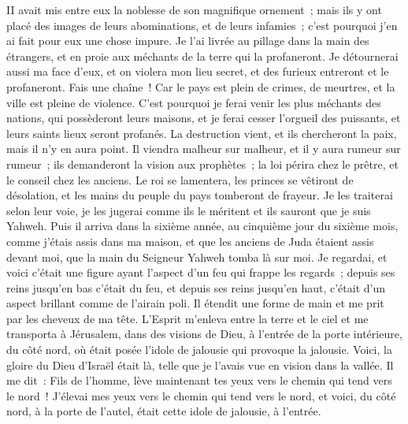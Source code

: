 \begin{multicols}{2}
II avait mis entre eux la noblesse de son magnifique ornement~; mais ils y ont placé des images de leurs abominations, et de leurs infamies~; c'est pourquoi j'en ai fait pour eux une chose impure.
Je l'ai livrée au pillage dans la main des étrangers, et en proie aux méchants de la terre qui la profaneront.
Je détournerai aussi ma face d'eux, et on violera mon lieu secret, et des furieux entreront et le profaneront.
Fais une chaîne~! Car le pays est plein de crimes, de meurtres, et la ville est pleine de violence.
C'est pourquoi je ferai venir les plus méchants des nations, qui possèderont leurs maisons, et je ferai cesser l'orgueil des puissants, et leurs saints lieux seront profanés.
La destruction vient, et ils chercheront la paix, mais il n'y en aura point.
Il viendra malheur sur malheur, et il y aura rumeur sur rumeur~; ils demanderont la vision aux prophètes~; la loi périra chez le prêtre, et le conseil chez les anciens.
Le roi se lamentera, les princes se vêtiront de désolation, et les mains du peuple du pays tomberont de frayeur. Je les traiterai selon leur voie, je les jugerai comme ils le méritent et ils sauront que je suis Yahweh.
\VerseOne{}Puis il arriva dans la sixième année, au cinquième jour du sixième mois, comme j'étais assis dans ma maison, et que les anciens de Juda étaient assis devant moi, que la main du Seigneur Yahweh tomba là sur moi.
Je regardai, et voici c'était une figure ayant l'aspect d'un feu qui frappe les regards~; depuis ses reins jusqu'en bas c'était du feu, et depuis ses reins jusqu'en haut, c'était d'un aspect brillant comme de l'airain poli.
Il étendit une forme de main et me prit par les cheveux de ma tête. L'Esprit m'enleva entre la terre et le ciel et me transporta à Jérusalem, dans des visions de Dieu, à l'entrée de la porte intérieure, du côté nord, où était posée l'idole de jalousie qui provoque la jalousie.
Voici, la gloire du Dieu d'Israël était là, telle que je l'avais vue en vision dans la vallée.
Il me dit~: Fils de l'homme, lève maintenant tes yeux vers le chemin qui tend vers le nord~! J'élevai mes yeux vers le chemin qui tend vers le nord, et voici, du côté nord, à la porte de l'autel, était cette idole de jalousie, à l'entrée.

\end{multicols}
